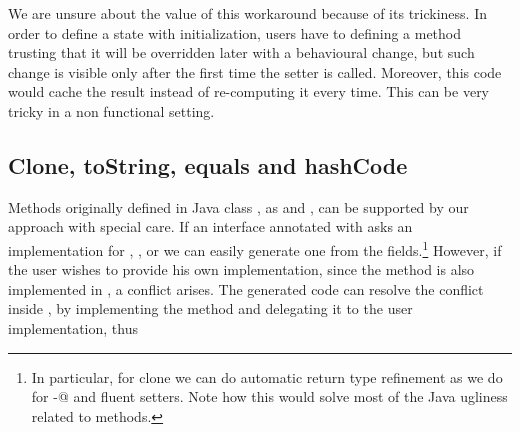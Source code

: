 We are unsure about the value of this workaround because of its trickiness. In
order to define a state with initialization, users have to defining a method trusting that it will be overridden later with a behavioural change, but
such change is visible only after the first time the setter is called. Moreover, this code would cache
the result instead of re-computing it every time. This can be very tricky in a
non functional setting.

\begin{comment}
\subsection{Class Invariants in ClassLess Java}
Since objects are created by automatically generated methods, another limitation
of our current approach is that there is no place where the user can dynamically
check for class invariants. In Java often we see code like
\begin{lstlisting}
class Point{ int x; int y;
  Point(int x; int y){this.x=x;this.y=y; assert this.checkInvariant();}
  private boolean checkInvariant(){... x>0,y>0...}
}
\end{lstlisting} 

We are considering an extension of our annotation where 
default methods with the special name \Q@checkInvariant()@ will be called inside the \Q@of@ methods.
If multiple interfaces are implemented, and more then one offers
\Q@checkInvariant()@,  a composed implementation could be automatically generated, composing by \Q@&&@ the various competing implementations.
\end{comment}

\subsection{Clone, toString, equals and hashCode}

Methods originally defined in Java class \Q@Object@, as \Q@clone@ and
\Q@toString@, can be supported by our approach with special care. If an
interface annotated with \mixin asks an implementation for \Q@clone@,
\Q@toString@, \Q@equals@ or \Q@hashCode@ we can easily generate one from the
fields.\footnote{In particular, for clone we can do automatic return type
  refinement as we do for \Q@with-@ and fluent setters. Note how this would
  solve most of the Java ugliness related to \Q@clone@ methods.}  However, if
the user wishes to provide his own implementation, since the method is also
implemented in \Q@Object@, a conflict arises. The generated code can resolve the
conflict inside \Q@of@, by implementing the method and delegating it to the user
implementation, thus

